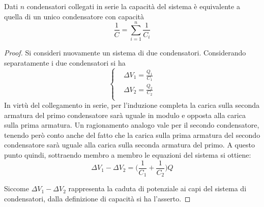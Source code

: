 \begin{thm}
    Dati $n$ condensatori collegati in serie la capacità del sistema è equivalente a quella di un unico condensatore con capacità
    \[
        \frac{1}{C}=\sum_{i=1}^n\frac{1}{C_i}
    \]
\end{thm}
\begin{proof}
    Si consideri nuovamente un sistema di due condensatori. Considerando separatamente i due condensatori si ha
    \[
        \begin{cases}
            & \Delta V_1=\frac{ Q_1 }{C_1}\\
            & \Delta V_2=\frac{ Q_2 }{C_2}\\
        \end{cases}
    \]
    In virtù del collegamento in serie, per l'induzione completa la carica sulla seconda armatura del primo condensatore sarà uguale
    in modulo e opposta alla carica sulla prima armatura. Un ragionamento analogo vale per il secondo condensatore, tenendo
    però conto anche del fatto che la carica sulla prima armatura del secondo condensatore sarà uguale alla carica sulla seconda
    armatura del primo. A questo punto quindi, sottraendo membro a membro le equazioni del sistema si ottiene:
    \[
        \Delta V_1 - \Delta V_2 = \Biggl(\frac{1}{C_1} + \frac{1}{C_2} \Biggr) Q
    \]

    Siccome $\Delta V_1 - \Delta V_2 $ rappresenta la caduta di potenziale ai capi del sistema di condensatori, dalla definizione di
    capacità si  ha l'asserto.
\end{proof}
